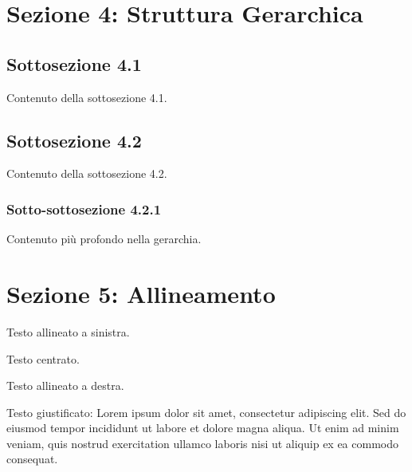 \documentclass[11pt, a4paper]{article}
\begin{document}
\section{Sezione 4: Struttura Gerarchica}

\subsection{Sottosezione 4.1}

Contenuto della sottosezione 4.1.

\subsection{Sottosezione 4.2}

Contenuto della sottosezione 4.2.

\subsubsection{Sotto-sottosezione 4.2.1}

Contenuto più profondo nella gerarchia.

\section{Sezione 5: Allineamento}

Testo allineato a sinistra.

\begin{center}
Testo centrato.
\end{center}

\begin{flushright}
Testo allineato a destra.
\end{flushright}

Testo giustificato: Lorem ipsum dolor sit amet, consectetur adipiscing elit. Sed do eiusmod tempor incididunt ut labore et dolore magna aliqua. Ut enim ad minim veniam, quis nostrud exercitation ullamco laboris nisi ut aliquip ex ea commodo consequat.
\end{document}
